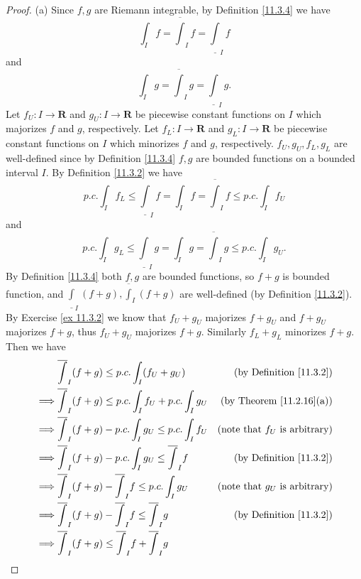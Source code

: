 \begin{proof}{(a)}
    Since \(f, g\) are Riemann integrable, by Definition \ref{11.3.4} we have
    \[
        \int_I f = \overline{\int}_I f = \underline{\int}_I f
    \]
    and
    \[
        \int_I g = \overline{\int}_I g = \underline{\int}_I g.
    \]
    Let \(f_U : I \to \mathbf{R}\) and \(g_U : I \to \mathbf{R}\) be piecewise constant functions on \(I\) which majorizes \(f\) and \(g\), respectively.
    Let \(f_L : I \to \mathbf{R}\) and \(g_L : I \to \mathbf{R}\) be piecewise constant functions on \(I\) which minorizes \(f\) and \(g\), respectively.
    \(f_U, g_U, f_L, g_L\) are well-defined since by Definition \ref{11.3.4} \(f, g\) are bounded functions on a bounded interval \(I\).
    By Definition \ref{11.3.2} we have
    \[
        p.c. \int_I f_L \leq \underline{\int}_I f = \int_I f = \overline{\int}_I f \leq p.c. \int_I f_U
    \]
    and
    \[
        p.c. \int_I g_L \leq \underline{\int}_I g = \int_I g = \overline{\int}_I g \leq p.c. \int_I g_U.
    \]
    By Definition \ref{11.3.4} both \(f, g\) are bounded functions, so \(f + g\) is bounded function, and \(\underline{\int}_I (f + g), \overline{\int}_I (f + g)\) are well-defined (by Definition \ref{11.3.2}).
    By Exercise \ref{ex 11.3.2} we know that \(f_U + g_U\) majorizes \(f + g_U\) and \(f + g_U\) majorizes \(f + g\), thus \(f_U + g_U\) majorizes \(f + g\).
    Similarly \(f_L + g_L\) minorizes \(f + g\).
    Then we have
    \begin{align*}
                 & \overline{\int}_I (f + g) \leq p.c. \int_I (f_U + g_U)                   & \text{(by Definition \ref{11.3.2})}     \\
        \implies & \overline{\int}_I (f + g) \leq p.c. \int_I f_U + p.c. \int_I g_U         & \text{(by Theorem \ref{11.2.16}(a))}    \\
        \implies & \overline{\int}_I (f + g) - p.c. \int_I g_U \leq p.c. \int_I f_U         & \text{(note that \(f_U\) is arbitrary)} \\
        \implies & \overline{\int}_I (f + g) - p.c. \int_I g_U \leq \overline{\int}_I f     & \text{(by Definition \ref{11.3.2})}     \\
        \implies & \overline{\int}_I (f + g) - \overline{\int}_I f \leq p.c. \int_I g_U     & \text{(note that \(g_U\) is arbitrary)} \\
        \implies & \overline{\int}_I (f + g) - \overline{\int}_I f \leq \overline{\int}_I g & \text{(by Definition \ref{11.3.2})}     \\
        \implies & \overline{\int}_I (f + g) \leq \overline{\int}_I f + \overline{\int}_I g &                                         \\

\end{align*}
\end{proof}
